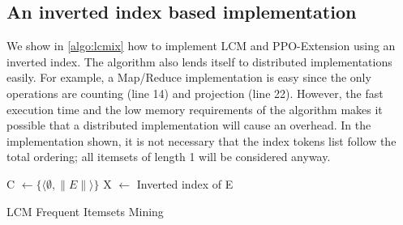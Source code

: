 \documentclass{sig-alternate}
\begin{document}
\subsection{An inverted index based implementation}
We show in \ref{algo:lcmix} how to implement LCM and PPO-Extension using an inverted index. The algorithm also lends itself to distributed implementations easily. For example, a Map/Reduce implementation is easy since the only operations are counting (line 14) and projection (line 22). However, the fast execution time and the low memory requirements of the algorithm makes it possible that a distributed implementation will cause an overhead. In the implementation shown, it is not necessary that the index tokens list follow the total ordering; all itemsets of length 1 will be considered anyway. 

\begin{algorithm}
\SetAlgoLined
\LinesNumbered
{}

C $\gets \{\langle \emptyset, \|E\|\rangle\}$ 
X $\gets$ Inverted index of E\;
\;


\caption{LCM Frequent Itemsets Mining}
\label{algo:lcmix}


\end{algorithm}
\end{document}
